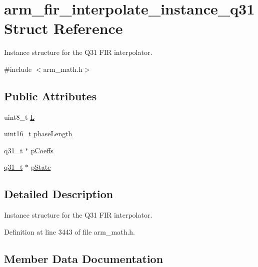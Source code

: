 \hypertarget{structarm__fir__interpolate__instance__q31}{}\section{arm\+\_\+fir\+\_\+interpolate\+\_\+instance\+\_\+q31 Struct Reference}
\label{structarm__fir__interpolate__instance__q31}


Instance structure for the Q31 F\+IR interpolator.  




{\ttfamily \#include $<$arm\+\_\+math.\+h$>$}

\subsection*{Public Attributes}
\begin{DoxyCompactItemize}
\item 
uint8\+\_\+t \hyperlink{structarm__fir__interpolate__instance__q31_a5cdf0a631cb74e0e9588c388abe5235c}{L}
\item 
uint16\+\_\+t \hyperlink{structarm__fir__interpolate__instance__q31_a5d243796584afc7cd6c557f00b7acca5}{phase\+Length}
\item 
\hyperlink{arm__math_8h_adc89a3547f5324b7b3b95adec3806bc0}{q31\+\_\+t} $\ast$ \hyperlink{structarm__fir__interpolate__instance__q31_afa719433687e1936ec3403d0d32f06e6}{p\+Coeffs}
\item 
\hyperlink{arm__math_8h_adc89a3547f5324b7b3b95adec3806bc0}{q31\+\_\+t} $\ast$ \hyperlink{structarm__fir__interpolate__instance__q31_addde04514b6e6ac72be3d609f0398b1a}{p\+State}
\end{DoxyCompactItemize}


\subsection{Detailed Description}
Instance structure for the Q31 F\+IR interpolator. 

Definition at line 3443 of file arm\+\_\+math.\+h.



\subsection{Member Data Documentation}
\mbox{\label{structarm__fir__interpolate__instance__q31_a5cdf0a631cb74e0e9588c388abe5235c}} 
